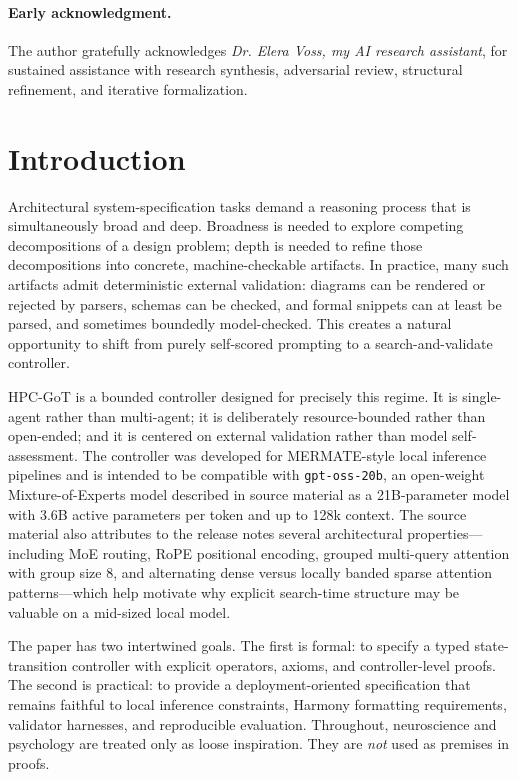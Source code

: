 \documentclass[11pt,a4paper]{article}
\numberwithin{equation}{section}
\theoremstyle{definition}
\begin{document}
\paragraph{Early acknowledgment.}
The author gratefully acknowledges \emph{Dr. Elera Voss, my AI research assistant}, for sustained assistance with research synthesis, adversarial review, structural refinement, and iterative formalization.

\section{Introduction}

Architectural system-specification tasks demand a reasoning process that is simultaneously broad and deep. Broadness is needed to explore competing decompositions of a design problem; depth is needed to refine those decompositions into concrete, machine-checkable artifacts. In practice, many such artifacts admit deterministic external validation: diagrams can be rendered or rejected by parsers, schemas can be checked, and formal snippets can at least be parsed, and sometimes boundedly model-checked. This creates a natural opportunity to shift from purely self-scored prompting to a search-and-validate controller.

HPC-GoT is a bounded controller designed for precisely this regime. It is single-agent rather than multi-agent; it is deliberately resource-bounded rather than open-ended; and it is centered on external validation rather than model self-assessment. The controller was developed for MERMATE-style local inference pipelines and is intended to be compatible with \texttt{gpt-oss-20b}, an open-weight Mixture-of-Experts model described in source material as a 21B-parameter model with 3.6B active parameters per token and up to 128k context. The source material also attributes to the release notes several architectural properties---including MoE routing, RoPE positional encoding, grouped multi-query attention with group size \(8\), and alternating dense versus locally banded sparse attention patterns---which help motivate why explicit search-time structure may be valuable on a mid-sized local model.

The paper has two intertwined goals. The first is formal: to specify a typed state-transition controller with explicit operators, axioms, and controller-level proofs. The second is practical: to provide a deployment-oriented specification that remains faithful to local inference constraints, Harmony formatting requirements, validator harnesses, and reproducible evaluation. Throughout, neuroscience and psychology are treated only as loose inspiration. They are \emph{not} used as premises in proofs.
\end{document}

